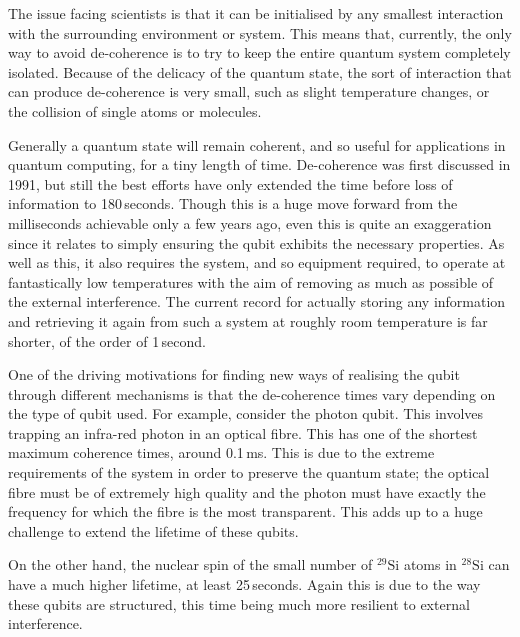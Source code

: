 \begin{figure}[ht]
	\centering
	\def\svgwidth{0.8\columnwidth}
	
\end{figure}

The issue facing scientists is that it can be initialised by any smallest interaction with the surrounding environment or system. This means that, currently, the only way to avoid de-coherence is to try to keep the entire quantum system completely isolated. Because of the delicacy of the quantum state, the sort of interaction that can produce de-coherence is very small, such as slight temperature changes, or the collision of single atoms or molecules. 

Generally a quantum state will remain coherent, and so useful for applications in quantum computing, for a tiny length of time. De-coherence was first discussed in 1991\cite{zurek:36}, but still the best efforts have only extended the time before loss of information to 180\,seconds\cite{Steger08062012}. Though this is a huge move forward from the milliseconds achievable only a few years ago, even this is quite an exaggeration since it relates to simply ensuring the qubit exhibits the necessary properties. As well as this, it also requires the system, and so equipment required, to operate at fantastically low temperatures with the aim of removing as much as possible of the external interference. The current record for actually storing any information and retrieving it again from such a system at roughly room temperature is far shorter, of the order of 1\,second\cite{Maurer08062012}.

One of the driving motivations for finding new ways of realising the qubit through different mechanisms is that the de-coherence times vary depending on the type of qubit used. For example, consider the photon qubit. This involves trapping an infra-red photon in an optical fibre. This has one of the shortest maximum coherence times, around 0.1\,ms. This is due to the extreme requirements of the system in order to preserve the quantum state; the optical fibre must be of extremely high quality and the photon must have exactly the frequency for which the fibre is the most transparent. This adds up to a huge challenge to extend the lifetime of these qubits.

On the other hand, the nuclear spin of the small number of ${}^{29}\text{Si}$ atoms in ${}^{28}\text{Si}$ can have a much higher lifetime, at least 25\,seconds. Again this is due to the way these qubits are structured, this time being much more resilient to external interference.

